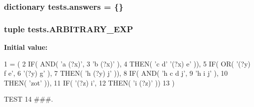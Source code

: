 \subsubsection[{answers}]{\setlength{\rightskip}{0pt plus 5cm}dictionary tests.\+answers = \{\}}\label{namespacetests_ae42eabc36e6ab074bbcf241bcfe07c3f}
\hypertarget{namespacetests_a272abf0a7c07eae1ba1918ee56ea1610}{}
\subsubsection[{A\+R\+B\+I\+T\+R\+A\+R\+Y\+\_\+\+E\+X\+P}]{\setlength{\rightskip}{0pt plus 5cm}tuple tests.\+A\+R\+B\+I\+T\+R\+A\+R\+Y\+\_\+\+E\+X\+P}\label{namespacetests_a272abf0a7c07eae1ba1918ee56ea1610}
{\bfseries Initial value\+:}
\begin{DoxyCode}
1 = (
2     IF( AND( \textcolor{stringliteral}{'a (?x)'},
3              \textcolor{stringliteral}{'b (?x)'} ),
4         THEN( \textcolor{stringliteral}{'c d'} \textcolor{stringliteral}{'(?x) e'} )),
5     IF( OR( \textcolor{stringliteral}{'(?y) f e'},
6             \textcolor{stringliteral}{'(?y) g'} ),
7         THEN( \textcolor{stringliteral}{'h (?y) j'} )),
8     IF( AND( \textcolor{stringliteral}{'h c d j'},
9              \textcolor{stringliteral}{'h i j'} ),
10         THEN( \textcolor{stringliteral}{'zot'} )),
11     IF( \textcolor{stringliteral}{'(?z) i'},
12         THEN( \textcolor{stringliteral}{'i (?z)'} ))
13     )
\end{DoxyCode}


T\+E\+S\+T 14 \#\#\#. 

\hypertarget{namespacetests_aad7560588da32a5e7c87a112a3171521}{}
